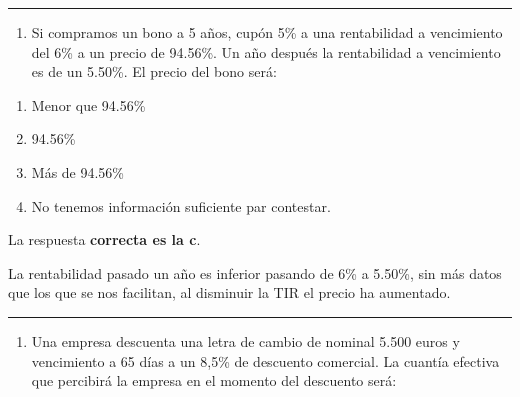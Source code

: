 \documentclass[
  letterpaper,
  DIV=11,
  numbers=noendperiod]{scrreprt}
\providecommand{\tightlist}{%
  \setlength{\itemsep}{0pt}\setlength{\parskip}{0pt}}\usepackage{longtable,booktabs,array}
\begin{document}
\begin{center}\rule{0.5\linewidth}{0.5pt}\end{center}

\begin{enumerate}
\def\labelenumi{\arabic{enumi}.}
\setcounter{enumi}{90}
\tightlist
\item
  Si compramos un bono a 5 años, cupón 5\% a una rentabilidad a
  vencimiento del 6\% a un precio de 94.56\%. Un año después la
  rentabilidad a vencimiento es de un 5.50\%. El precio del bono será:
\end{enumerate}

\begin{enumerate}
\def\labelenumi{\alph{enumi})}
\item
  Menor que 94.56\%
\item
  94.56\%
\item
  Más de 94.56\%
\item
  No tenemos información suficiente par contestar.
\end{enumerate}

\begin{tcolorbox}[enhanced jigsaw, left=2mm, opacityback=0, colback=white, breakable, arc=.35mm, bottomrule=.15mm, rightrule=.15mm, toprule=.15mm, leftrule=.75mm, colframe=quarto-callout-tip-color-frame]
\begin{minipage}[t]{5.5mm}
\textcolor{quarto-callout-tip-color}{\faLightbulb}
\end{minipage}%
\begin{minipage}[t]{\textwidth - 5.5mm}

La respuesta \textbf{correcta es la c}.

La rentabilidad pasado un año es inferior pasando de 6\% a 5.50\%, sin
más datos que los que se nos facilitan, al disminuir la TIR el precio ha
aumentado.

\end{minipage}%
\end{tcolorbox}

\begin{center}\rule{0.5\linewidth}{0.5pt}\end{center}

\begin{enumerate}
\def\labelenumi{\arabic{enumi}.}
\setcounter{enumi}{91}
\tightlist
\item
  Una empresa descuenta una letra de cambio de nominal 5.500 euros y
  vencimiento a 65 días a un 8,5\% de descuento comercial. La cuantía
  efectiva que percibirá la empresa en el momento del descuento será:
\end{enumerate}
\end{document}
